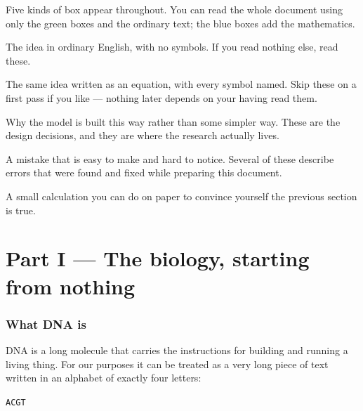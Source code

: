 \documentclass[11pt,a4paper]{article}
\newcommand{\code}[1]{\texttt{\small #1}}
\begin{document}
Five kinds of box appear throughout. You can read the whole document using only
the green boxes and the ordinary text; the blue boxes add the mathematics.

\begin{plainbox}
The idea in ordinary English, with no symbols. If you read nothing else, read
these.
\end{plainbox}

\begin{mathbox}
The same idea written as an equation, with every symbol named. Skip these on a
first pass if you like --- nothing later depends on your having read them.
\end{mathbox}

\begin{whybox}
Why the model is built this way rather than some simpler way. These are the
design decisions, and they are where the research actually lives.
\end{whybox}

\begin{carefulbox}
A mistake that is easy to make and hard to notice. Several of these describe
errors that were found and fixed while preparing this document.
\end{carefulbox}

\begin{checkbox}
A small calculation you can do on paper to convince yourself the previous
section is true.
\end{checkbox}

\part*{Part I --- The biology, starting from nothing}

\section{What DNA is}

DNA is a long molecule that carries the instructions for building and running a
living thing. For our purposes it can be treated as a very long piece of text
written in an alphabet of exactly four letters:

\begin{center}
\code{A}\quad \code{C}\quad \code{G}\quad \code{T}
\end{center}
\end{document}
